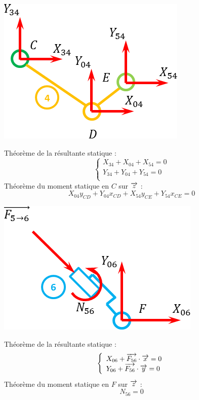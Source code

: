 \documentclass[11pt,oneside]{article}
\begin{document}
\begin{exemple}
\begin{minipage}[c]{.35\linewidth}
\begin{center}
\includegraphics[width=.9\textwidth]{png/4}
\end{center}
\end{minipage}\hfill
\begin{minipage}[c]{.6\linewidth}
Théorème de la résultante statique : 
$$
\left\{
\begin{array}{l}
X_{34}+X_{04}+X_{54}=0 \\
Y_{34}+Y_{04}+Y_{54}=0 \\
\end{array}
\right.
$$
Théorème du moment statique en $C$ sur $\overrightarrow{z}$ : 
$$
X_{04}y_{CD}+Y_{04}x_{CD}+X_{54}y_{CE}+Y_{54}x_{CE}=0
$$
\end{minipage}

\begin{minipage}[c]{.35\linewidth}
\begin{center}
\includegraphics[width=.9\textwidth]{png/6}
\end{center}
\end{minipage}\hfill
\begin{minipage}[c]{.6\linewidth}
Théorème de la résultante statique : 
$$
\left\{
\begin{array}{l}
X_{06}+\overrightarrow{F_{56}}\cdot\overrightarrow{x}=0\\
Y_{06}+\overrightarrow{F_{56}}\cdot\overrightarrow{y}=0\\
\end{array}
\right.
$$
Théorème du moment statique en $F$ sur $\overrightarrow{z}$ : 
$$
N_{56}=0
$$
\end{minipage}


\end{exemple}
\end{document}
